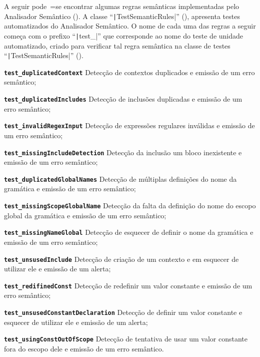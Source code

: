 A seguir pode~=se encontrar algumas regras semânticas implementadas pelo Analisador Semântico ().
A classe ``\texttt|TestSemanticRules|'' (),
apresenta testes automatizados do Analisador Semântico.
O nome de cada uma das regras a seguir começa com o prefixo ``\texttt|test_|'' que corresponde ao nome do teste de unidade automatizado,
criado para verificar tal regra semântica na classe de testes ``\texttt|TestSemanticRules|'' ().
\begin{enumerateoptional}[1)]
    \item[\bfseries\texttt{test_duplicatedContext}] Detecção de contextos duplicados e
    emissão de um erro semântico;

    \item[\bfseries\texttt{test_duplicatedIncludes}] Detecção de inclusões duplicadas  e
    emissão de um erro semântico;

    \item[\bfseries\texttt{test_invalidRegexInput}] Detecção de expressões regulares inválidas e
    emissão de um erro semântico;

    \item[\bfseries\texttt{test_missingIncludeDetection}] Detecção da inclusão um bloco inexistente e
    emissão de um erro semântico;

    \item[\bfseries\texttt{test_duplicatedGlobalNames}] Detecção de múltiplas definições do nome da gramática e
    emissão de um erro semântico;

    \item[\bfseries\texttt{test_missingScopeGlobalName}] Detecção da falta da definição do nome do escopo global da gramática e
    emissão de um erro semântico;

    \item[\bfseries\texttt{test_missingNameGlobal}] Detecção de esquecer de definir o nome da gramática e
    emissão de um erro semântico;

    \item[\bfseries\texttt{test_unsusedInclude}] Detecção de criação de um contexto e
    em esquecer de utilizar ele e
    emissão de um alerta;

    \item[\bfseries\texttt{test_redifinedConst}] Detecção de redefinir um valor constante e
    emissão de um erro semântico;

    \item[\bfseries\texttt{test_unsusedConstantDeclaration}] Detecção de definir um valor constante e esquecer de utilizar ele e
    emissão de um alerta;

    \item[\bfseries\texttt{test_usingConstOutOfScope}] Detecção de tentativa de usar um valor constante fora do escopo dele e
    emissão de um erro semântico.
\end{enumerateoptional}%
